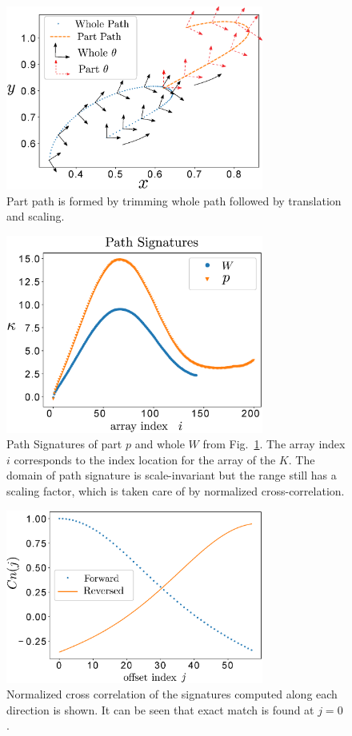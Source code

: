 \documentclass[twocolumn,10pt]{asme2e}
\begin{document}
\begin{figure}
\centering
\includegraphics[width=240pt]{figure/fig_whole_part.eps}
  \caption{Part path is formed by trimming whole path followed by translation and scaling.}
\label{wholePart}
\end{figure}

\begin{figure}
\centering
\includegraphics[width=240pt]{figure/fig_path_signatures.eps}
  \caption{Path Signatures of part $p$ and whole $W$ from Fig.~\ref{wholePart}. The array index $i$ corresponds to the index location for the array of the $K$. The domain of path signature is scale-invariant but the range still has a scaling factor, which is taken care of by normalized cross-correlation.}
\label{pathSignature}
\end{figure}

\begin{figure}
\centering
\includegraphics[width=240pt]{figure/fig_ncc.eps}
  \caption{Normalized cross correlation of the signatures computed along each direction is shown. It can be seen that exact match is found at $j=0$.}
\label{ncc}
\end{figure}
\end{document}
